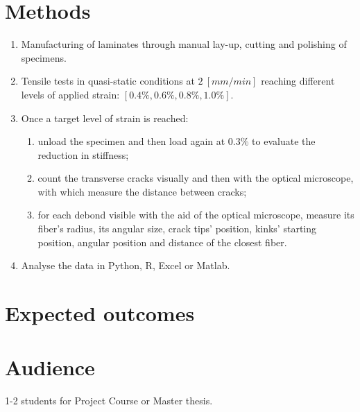 \documentclass[review]{elsarticle}
\begin{document}
\section{Methods}
\begin{enumerate}
\item Manufacturing of laminates through manual lay-up, cutting and polishing of specimens.
\item Tensile tests in quasi-static conditions at $2\ \left[mm/min\right]$ reaching different levels of applied strain: $\left[0.4\%, 0.6\%, 0.8\%, 1.0\%\right]$.
\item Once a target level of strain is reached:
\begin{enumerate}[label=\alph*]
\item unload the specimen and then load again at $0.3\%$ to evaluate the reduction in stiffness;
\item count the transverse cracks visually and then with the optical microscope, with which measure the distance between cracks;
\item for each debond visible with the aid of the optical microscope, measure its fiber's radius, its angular size, crack tips' position, kinks' starting position, angular position and distance of the closest fiber.
\end{enumerate}
\item Analyse the data in Python, R, Excel or Matlab.
\end{enumerate}

\section{Expected outcomes}

\section{Audience}
1-2 students for Project Course or Master thesis.



\end{document}
